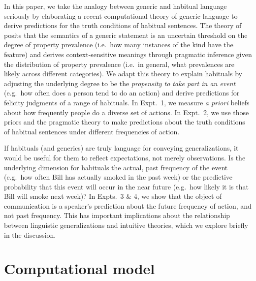 \documentclass[10pt,letterpaper]{article}
\newcommand{\ndg}[1]{\textcolor{Green}{[ndg: #1]}}
\newcommand{\mht}[1]{\textcolor{DarkOrange}{[mht: #1]}}
\begin{document}
In this paper, we take the analogy between generic and habitual language seriously by elaborating a recent computational theory of generic language to derive predictions for the truth conditions of habitual sentences. 
The theory of  posits that the semantics of a generic statement is an uncertain threshold on the degree of property prevalence (i.e.~how many instances of the kind have the feature) and derives context-sensitive meanings through pragmatic inference given the distribution of property prevalence (i.e.~in general, what prevalences are  likely across different categories).
We adapt this theory to explain habituals by adjusting the underlying degree to be the \emph{propensity to take part in an event} (e.g.~how often does a person tend to do an action) and derive predictions for felicity judgments of a range of habituals.
In Expt.~1, we measure \emph{a priori} beliefs about how frequently people do a diverse set of actions.
In Expt.~2, we use those priors and the pragmatic theory to make predictions about the truth conditions of habitual sentences under different frequencies of action. 


If habituals (and generics) are truly language for conveying generalizations, it would be useful for them to reflect expectations, not merely observations.
Is the underlying dimension for habituals the actual, past frequency of the event (e.g.~how often Bill has actually smoked in the past week) or the predictive probability that this event will occur in the near future (e.g.~how likely it is that Bill will smoke next week)?
In Expts.~3 \& 4, we show that the object of communication is a speaker's prediction about the future frequency of action, and not past frequency.
This has important implications about the relationship between linguistic generalizations and intuitive theories, which we explore briefly in the discussion.


\section{Computational model}
\end{document}
